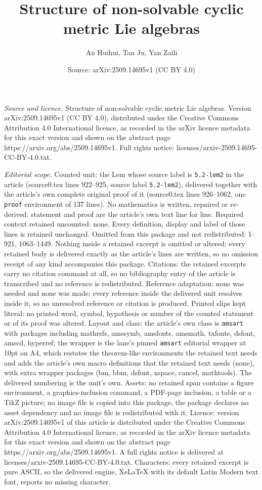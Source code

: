 \documentclass[10pt,a4paper]{amsart}
\title[Structure of non-solvable cyclic metric Lie algebras]{Structure of non-solvable cyclic metric Lie algebras}
\author{An Huihui, Tan Ju, Yan Zaili}
\date{Source: arXiv:2509.14695v1 (CC BY 4.0)}
\begin{document}
\maketitle

\noindent\emph{Source and licence.} Structure of non-solvable cyclic metric Lie algebras. Version arXiv:2509.14695v1 (CC BY 4.0), distributed under the Creative Commons Attribution 4.0 International licence, as recorded in the arXiv licence metadata for this exact version and shown on the abstract page https://arxiv.org/abs/2509.14695v1. Full rights notice: licenses/arxiv-2509.14695-CC-BY-4.0.txt.\par\smallskip

\noindent\textit{Editorial scope.} Counted unit: the Lem whose source label is \texttt{5.2-lem2} in the article (source0.tex lines 922--925, source label \texttt{5.2-lem2}), delivered together with the article's own complete original proof of it (source0.tex lines 926--1062, one \texttt{proof} environment of 137 lines). No mathematics is written, repaired or re-derived: statement and proof are the article's own text line for line. Required context retained uncounted: none. Every definition, display and label of those lines is retained unchanged. Omitted from this package and not redistributed: 1--921, 1063--1449. Nothing inside a retained excerpt is omitted or altered: every retained body is delivered exactly as the article's lines are written, so no omission receipt of any kind accompanies this package. Citations: the retained excerpts carry no citation command at all, so no bibliography entry of the article is transcribed and no reference is redistributed. Reference adaptation: none was needed and none was made; every reference inside the delivered unit resolves inside it, so no unresolved reference or citation is produced. Printed slips kept literal: no printed word, symbol, hypothesis or number of the counted statement or of its proof was altered. Layout and class: the article's own class is \texttt{amsart} with packages including mathrsfs, amssymb, amsfonts, amsmath, txfonts, dsfont, amscd, hyperref; the wrapper is the lane's pinned \texttt{amsart} editorial wrapper at 10pt on A4, which restates the theorem-like environments the retained text needs and adds the article's own macro definitions that the retained text needs (none), with extra wrapper packages (bm, bbm, dsfont, xspace, cancel, mathtools). The delivered numbering is the unit's own. Assets: no retained span contains a figure environment, a graphics-inclusion command, a PDF-page inclusion, a table or a TikZ picture; no image file is copied into this package, the package declares no asset dependency and no image file is redistributed with it. Licence: version arXiv:2509.14695v1 of this article is distributed under the Creative Commons Attribution 4.0 International licence, as recorded in the arXiv licence metadata for this exact version and shown on the abstract page https://arxiv.org/abs/2509.14695v1. A full rights notice is delivered at licenses/arxiv-2509.14695-CC-BY-4.0.txt. Characters: every retained excerpt is pure ASCII, so the delivered engine, XeLaTeX with its default Latin Modern text font, reports no missing character.
\end{document}
